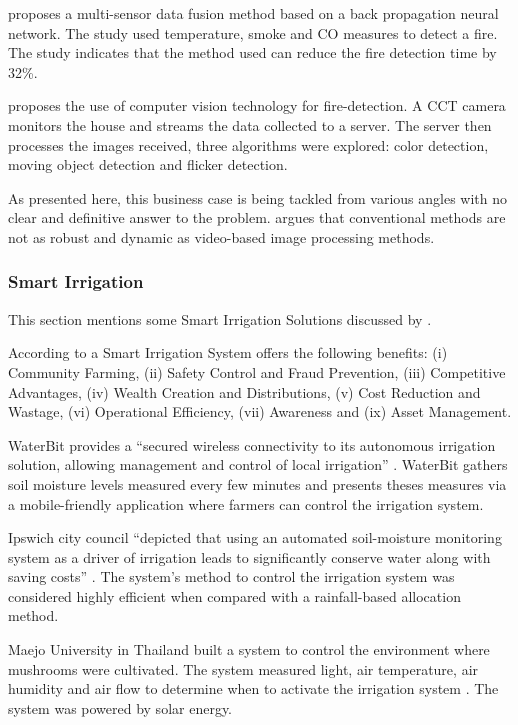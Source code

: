 \cite{wu2021multi} proposes a multi-sensor data fusion method based on a back propagation neural network. The study used temperature, smoke and CO measures to detect a fire. The study indicates that the method used can reduce the fire detection time by 32\%.

\cite{mohammed2021computer} proposes the use of computer vision technology for fire-detection. A \gls{CCT} camera monitors the house and streams the data collected to a server. The server then processes the images received, three algorithms were explored: color detection, moving object detection and flicker detection.

As presented here, this business case is being tackled from various angles with no clear and definitive answer to the problem. \cite{article-fire} argues that conventional methods are not as robust and dynamic as video-based image processing methods.

\subsubsection{Smart Irrigation}
\label{subsubsec:stateofart:arch:solutions:irrigation}

This section mentions some Smart Irrigation Solutions discussed by \cite{OBAIDEEN2022100124}.

According to \cite{8372905} a Smart Irrigation System offers the following benefits: (i) Community Farming, (ii) Safety Control and Fraud Prevention, (iii) Competitive Advantages, (iv) Wealth Creation and Distributions, (v) Cost Reduction and Wastage, (vi) Operational Efficiency, (vii) Awareness and (ix) Asset Management.

WaterBit provides a ``secured wireless connectivity to its autonomous irrigation solution, allowing management and control of local irrigation'' \parencite{OBAIDEEN2022100124}. WaterBit gathers soil moisture levels measured every few minutes and presents theses measures via a mobile-friendly application where farmers can control the irrigation system.

Ipswich city council ``depicted that using an automated soil-moisture monitoring system as a driver of irrigation leads to significantly conserve water along with saving costs'' \parencite{OBAIDEEN2022100124}. The system's method to control the irrigation system was considered highly efficient when compared with a rainfall-based allocation method.

Maejo University in Thailand built a system to control the environment where mushrooms were cultivated. The system measured light, air temperature, air humidity and air flow to determine when to activate the irrigation system \parencite{OBAIDEEN2022100124}. The system was powered by solar energy.

